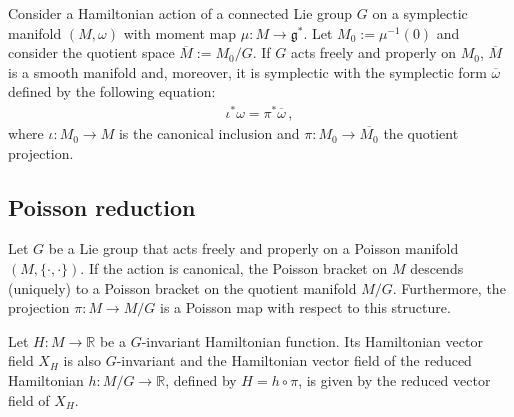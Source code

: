     \begin{theorem}
        Consider a Hamiltonian action of a connected Lie group $G$ on a symplectic manifold $(M,\omega)$ with moment map $\mu:M\rightarrow\mathfrak{g}^*$. Let $M_0:=\mu^{-1}(0)$ and consider the quotient space $\overline{M}:=M_0/G$. If $G$ acts freely and properly on $M_0$, $\overline{M}$ is a smooth manifold and, moreover, it is symplectic with the symplectic form $\overline{\omega}$ defined by the following equation:
        \begin{gather}
            \iota^*\omega = \pi^*\overline{\omega}\,,
        \end{gather}
        where $\iota:M_0\rightarrow M$ is the canonical inclusion and $\pi:M_0\rightarrow\overline{M_0}$ the quotient projection.
    \end{theorem}

\subsection{Poisson reduction}


    \begin{theorem}
        Let $G$ be a Lie group that acts freely and properly on a Poisson manifold $(M,\{\cdot,\cdot\})$. If the action is canonical, the Poisson bracket on $M$ descends (uniquely) to a Poisson bracket on the quotient manifold $M/G$. Furthermore, the projection $\pi:M\rightarrow M/G$ is a Poisson map with respect to this structure.
    \end{theorem}
    \begin{property}
        Let $H:M\rightarrow\mathbb{R}$ be a $G$-invariant Hamiltonian function. Its Hamiltonian vector field $X_H$ is also $G$-invariant and the Hamiltonian vector field of the reduced Hamiltonian $h:M/G\rightarrow\mathbb{R}$, defined by $H=h\circ\pi$, is given by the reduced vector field of $X_H$.
    \end{property}

